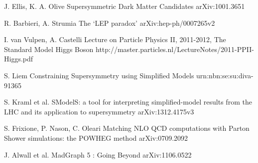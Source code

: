

\begin{thebibliography}{2}


\singlespace

             {J. Ellis, K. A. Olive}
             {Supersymmetric Dark Matter Candidates}
             {arXiv:1001.3651}


             {R. Barbieri, A. Strumia}
             {The `LEP paradox'}
             {arXiv:hep-ph/0007265v2}

             {I. van Vulpen, A. Castelli}
             {Lecture on Particle Physics II, 2011-2012, The Standard Model Higgs Boson}
             {http://master.particles.nl/LectureNotes/2011-PPII-Higgs.pdf}




             {S. Liem}
             {Constraining Supersymmetry using Simplified Models}
             {urn:nbn:se:su:diva-91365}

             {S. Kraml et al.}
             {SModelS: a tool for interpreting simplified-model results from the LHC and its application to supersymmetry}
             {arXiv:1312.4175v3}


             {S. Frixione, P. Nason, C. Oleari}
             {Matching NLO QCD computations with Parton Shower simulations: the POWHEG method}
             {arXiv:0709.2092}

             {J. Alwall et al.}
             {MadGraph 5 : Going Beyond}
             {arXiv:1106.0522}


\end{thebibliography}
